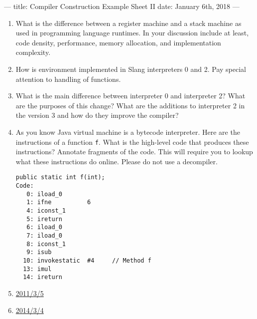 ---
title: Compiler Construction Example Sheet II
date: January 6th, 2018
---



\begin{enumerate}
  \item What is the difference between a register machine and a stack machine
    as used in programming language runtimes. In your discussion include at
    least, code density, performance, memory allocation, and implementation
    complexity.

  \item How is environment implemented in Slang interpreters 0 and 2. Pay
    special attention to handling of functions.

  \item What is the main difference between interpreter 0 and interpreter 2?
    What are the purposes of this change? What are the additions to interpreter
    2 in the version 3 and how do they improve the compiler?

  \item As you know Java virtual machine is a bytecode interpreter. Here are
    the instructions of a function \texttt{f}. What is the high-level code that
    produces these instructions? Annotate fragments of the code. This will
    require you to lookup what these instructions do online. Please do not use
    a decompiler.

    \begin{verbatim}
public static int f(int);
Code:
   0: iload_0
   1: ifne          6
   4: iconst_1
   5: ireturn
   6: iload_0
   7: iload_0
   8: iconst_1
   9: isub
  10: invokestatic  #4     // Method f
  13: imul
  14: ireturn
    \end{verbatim}

  \item \href{http://www.cl.cam.ac.uk/teaching/exams/pastpapers/y2011p3q5.pdf}{2011/3/5}

  \item \href{http://www.cl.cam.ac.uk/teaching/exams/pastpapers/y2014p3q4.pdf}{2014/3/4}
\end{enumerate}


